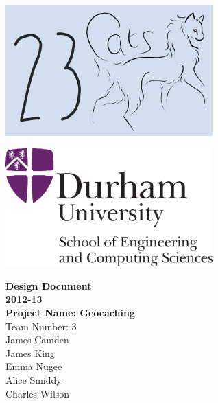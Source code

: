 \newcommand{\authorline}[1]{{\LARGE #1}\\[1cm]}

\begin{titlepage}
\begin{center}
\begin{minipage}{0.4\textwidth}
\begin{flushleft}
\includegraphics[width=0.6\textwidth]{images/logo}~\\[2cm]
\end{flushleft}
\end{minipage}
\begin{minipage}{0.4\textwidth}
\begin{flushright}
\includegraphics[width=0.6\textwidth]{logo}~\\[2cm]
\end{flushright}
\end{minipage}

\vspace{3cm}
{\bf
    {\Huge Design Document} \\
    [1cm]

    {\Huge 2012-13} \\
    [1cm]

    {\Huge Project Name: Geocaching} \\
    [2cm]
}
{\huge Team Number: 3} \\
[1cm]

\authorline{James Camden}

\authorline{James King}

\authorline{Emma Nugee}

\authorline{Alice Smiddy}

\authorline{Charles Wilson}
\end{center}
\end{titlepage}
